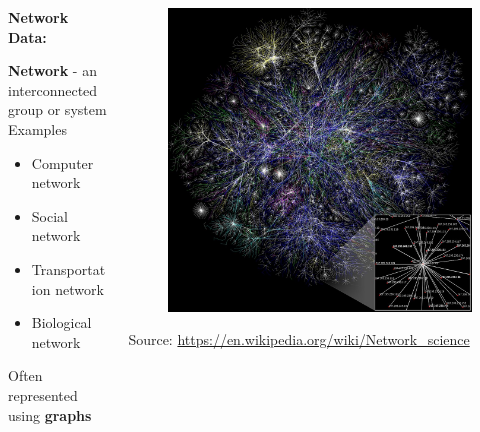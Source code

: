 \documentclass[aspectratio=169]{beamer}
\begin{document}
\begin{frame}
	
	\begin{columns}
		\begin{column}{0.5\textwidth}
			
			\textbf{Network Data:}
			
			\vspace{6mm}
			
			\textbf{Network} - an interconnected group or system \\
			\vspace{3mm}
			Examples
			\begin{itemize}
				\item Computer network
				\item Social network
				\item Transportation network
				\item Biological network
			\end{itemize} \vspace{3mm}
			Often represented using \textbf{graphs}
		\end{column}
		
		\begin{column}{0.5\textwidth}
			\begin{figure}
				\centering
				\includegraphics[width=0.9\linewidth]{images/internet}
				\label{fig:internet}
			\end{figure}
			\tiny Source: \url{https://en.wikipedia.org/wiki/Network_science}
		\end{column}
		
	\end{columns}
	
\end{frame}
\end{document}
